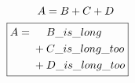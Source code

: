 \documentclass[varwidth, border={-120pt 10pt 10pt 10pt}]{standalone}
\begin{document}
\begin{align}
    \begin{split}
        A ={}& B + C + D
    \end{split}\nonumber\\
  \mathrlap{\boxed{\phantom{\begin{gathered}A = {}+ C\_is\_long\_too\\A\\A\end{gathered}}}}
  \hspace{\dimexpr\fboxsep+\fboxrule-0.4pt}
  \begin{split}
        A ={}& \phantom{{}+{}} B\_is\_long\\
             &            +    C\_is\_long\_too\\
             &            +    D\_is\_long\_too
    \end{split}
\end{align}
\end{document}
